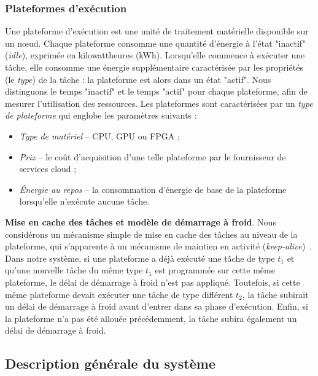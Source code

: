 \subsubsection{Plateformes d'exécution}
\label{model:platforms}

Une plateforme d'exécution est une unité de traitement matérielle disponible sur un nœud. Chaque plateforme consomme une quantité d'énergie à l'état "inactif" (\textit{idle}), exprimée en kilowattheures (kWh). Lorsqu'elle commence à exécuter une tâche, elle consomme une énergie supplémentaire caractérisée par les propriétés (le \textit{type}) de la tâche : la plateforme est alors dans un état "actif". Nous distinguons le temps "inactif" et le temps "actif" pour chaque plateforme, afin de mesurer l'utilisation des ressources. Les plateformes sont caractérisées par un \textit{type de plateforme} qui englobe les paramètres suivants :

\begin{itemize}
    \item \textit{Type de matériel} -- CPU, GPU ou FPGA ;
    \item \textit{Prix} -- le coût d'acquisition d'une telle plateforme par le fournisseur de services cloud ;
    \item \textit{Énergie au repos} -- la consommation d'énergie de base de la plateforme lorsqu'elle n'exécute aucune tâche.
\end{itemize}

\textbf{Mise en cache des tâches et modèle de démarrage à froid}. Nous considérons un mécanisme simple de mise en cache des tâches au niveau de la plateforme, qui s'apparente à un mécanisme de maintien en activité (\textit{keep-alive})~\cite{7279063}. Dans notre système, si une plateforme a déjà exécuté une tâche de type $t_1$ et qu'une nouvelle tâche du même type $t_1$ est programmée sur cette même plateforme, le délai de démarrage à froid n'est pas appliqué. Toutefois, si cette même plateforme devait exécuter une tâche de type différent $t_2$, la tâche subirait un délai de démarrage à froid avant d'entrer dans sa phase d'exécution. Enfin, si la plateforme n'a pas été allouée précédemment, la tâche subira également un délai de démarrage à froid.

\subsection{Description générale du système}


